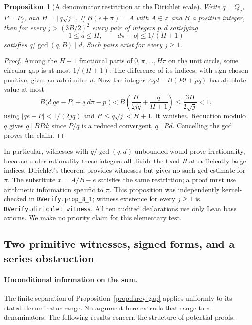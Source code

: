 \documentclass[11pt]{amsart}
\newtheorem{proposition}[theorem]{Proposition}
\theoremstyle{definition}
\theoremstyle{remark}
\numberwithin{equation}{section}
\newcommand{\Z}{\mathbb{Z}}
\begin{document}
\begin{proposition}[A denominator restriction at the Dirichlet scale]
\label{prop:dirichlet-divisor}
Write $q=Q_j$, $P=P_j$, and $H=\lfloor q\sqrt j\rfloor$.
If $B(e+\pi)=A$ with $A\in\Z$ and $B$ a positive integer,
then for every $j>(3B/2)^2$ every pair of integers $p,d$ satisfying
\[
 1\le d\le H,\qquad |d\pi-p|\le 1/(H+1)
\]
satisfies $q/\gcd(q,B)\mid d$. Such pairs exist for every $j\ge1$.
\end{proposition}
\begin{proof}
Among the $H+1$ fractional parts of $0,\pi,\ldots,H\pi$ on the
unit circle, some circular gap is at most $1/(H+1)$. The difference
of its indices, with sign chosen positive, gives an admissible $d$.
Now the integer $Aqd-B(Pd+pq)$ has absolute value at most
\[
 B\bigl(d|qe-P|+q|d\pi-p|\bigr)
 < B\left(\frac{H}{2jq}+\frac{q}{H+1}\right)
 \le \frac{3B}{2\sqrt j}<1,
\]
using $|qe-P|<1/(2jq)$ and $H\le q\sqrt j<H+1$.
It vanishes. Reduction modulo $q$ gives $q\mid BPd$; since $P/q$
is a reduced convergent, $q\mid Bd$. Cancelling the gcd proves the claim.
\end{proof}
In particular, witnesses with $q/\gcd(q,d)$ unbounded would prove
irrationality, because under rationality these integers all divide
the fixed $B$ at sufficiently large indices. Dirichlet's theorem
provides witnesses but gives no such gcd estimate for $\pi$.
The substitute $x=A/B-e$ satisfies the same restriction; a proof
must use arithmetic information specific to $\pi$. This proposition was independently kernel-checked in \texttt{DVerify.prop\_8\_1}; witness existence for every $j\ge1$ is \texttt{DVerify.dirichlet\_witness}. All ten audited declarations use only Lean base axioms. We make no priority claim for this elementary test.
\subsection{Two primitive witnesses, signed forms, and a series obstruction}
\paragraph{Unconditional information on the sum.}
The finite separation of Proposition~\ref{prop:farey-gap} applies
uniformly to its stated denominator range. No argument here extends
that range to all denominators. The following results concern the
structure of potential proofs.
\end{document}
